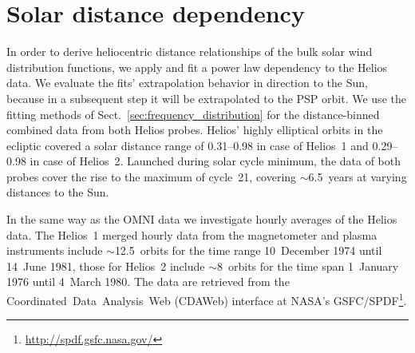 \section{Solar distance dependency}
\label{sec:solar_distance_dependency}
In order to derive heliocentric distance relationships of the bulk solar wind distribution functions, we apply and fit a power law dependency to the Helios data. We evaluate the fits’ extrapolation behavior in direction to the Sun, because in a subsequent step it will be extrapolated to the PSP orbit. We use the fitting methods of Sect.~\ref{sec:frequency_distribution} for the distance-binned combined data from both Helios probes. Helios’ highly elliptical orbits in the ecliptic covered a solar distance range of \SIrange{0.31}{0.98}{\au} in case of Helios~1 and \SIrange{0.29}{0.98}{\au} in case of Helios~2. Launched during solar cycle minimum, the data of both probes cover the rise to the maximum of cycle~21, covering $\sim$6.5~years at varying distances to the Sun.

In the same way as the OMNI data we investigate hourly averages of the Helios data. The Helios~1 merged hourly data from the magnetometer and plasma instruments \citep{Rosenbauer1977} include $\sim$12.5~orbits for the time range 10~December 1974 until 14~June 1981, those for Helios~2 include $\sim$8~orbits for the time span 1~January 1976 until 4~March 1980. The data are retrieved from the Coordinated~Data~Analysis~Web (CDAWeb) interface at NASA's GSFC/SPDF\footnote{\url{http://spdf.gsfc.nasa.gov/}}.

